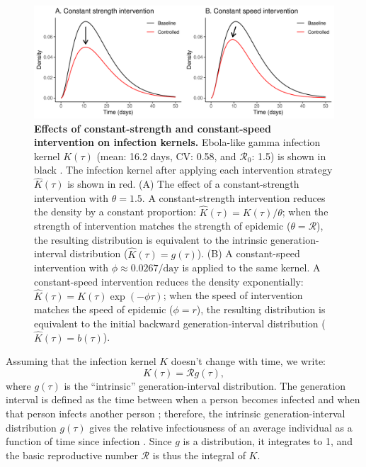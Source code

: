 \documentclass[12pt]{article}
\newcommand{\Rx}[1]{\ensuremath{{\mathcal R}_{#1}}}
\newcommand{\Ro}{\Rx{0}}
\newcommand{\RR}{\ensuremath{{\mathcal R}}}
\newcommand{\figlab}[1]{\label{fig:#1}}
\newcommand{\eqlab}[1]{\label{eq:#1}}
\begin{document}
\begin{figure}[!t]
\includegraphics[width=\textwidth]{../figure/constant_intervention.pdf}
\caption{
\textbf{Effects of constant-strength and constant-speed intervention on infection kernels.}
Ebola-like gamma infection kernel $K(\tau)$ (mean: 16.2 days, CV: 0.58, and \Ro: 1.5) is shown in black \citep{park2019practical}.
The infection kernel after applying each intervention strategy $\hat K(\tau)$ is shown in red.
(A) The effect of a constant-strength intervention with $\theta = 1.5$.
A constant-strength intervention reduces the density by a constant proportion: $\hat K(\tau) = K(\tau)/\theta$; when the strength of intervention matches the strength of epidemic ($\theta = \mathcal R$), the resulting distribution is equivalent to the intrinsic generation-interval distribution ($\hat K(\tau) = g(\tau)$).
(B) A constant-speed intervention with $\phi \approx 0.0267/\mathrm{day}$ is applied to the same kernel.
A constant-speed intervention reduces the density exponentially: $\hat K(\tau) = K(\tau) \exp(-\phi \tau)$; when the speed of intervention matches the speed of epidemic ($\phi = r$), the resulting distribution is equivalent to the initial backward generation-interval distribution ($\hat K(\tau) = b(\tau)$). 
}
\figlab{constant}
\end{figure}

Assuming that the infection kernel $K$ doesn't change with time, we write:
\begin{equation}
	K(\tau) = \RR g(\tau),
	\eqlab{strengthFactors}
\end{equation}
where $g(\tau)$ is the ``intrinsic'' generation-interval distribution.
The generation interval is defined as the time between when a person becomes infected and when that person infects another person \citep{svensson2007note};
therefore, the intrinsic generation-interval distribution $g(\tau)$ gives the relative infectiousness of an average individual as a function of time since infection \citep{champredon2015intrinsic}. 
Since $g$ is a distribution, it integrates to 1, and the basic reproductive number $\RR$ is thus the integral of $K$.
\end{document}
